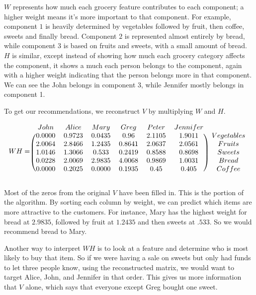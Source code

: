 $W$ represents how much each grocery feature contributes to each component; a higher weight means it's more important to that component.
For example, component $1$ is heavily determined by vegetables followed by fruit, then coffee, sweets and finally bread.
Component $2$ is represented almost entirely by bread, while component $3$ is based on fruits and sweets, with a small amount of bread.
$H$ is similar, except instead of showing how much each grocery category affects the component, it shows a much each person belongs to the component, again with a higher weight indicating that the person belongs more in that component.
We can see the John belongs in component $3$, while Jennifer mostly belongs in component 1.

To get our recommendations, we reconstruct $V$ by multiplying $W$ and $H$.

\[
WH =
\begin{blockarray}{ccccccc}
  John&  Alice  &Mary & Greg & Peter & Jennifer\\
  \begin{block}{(cccccc)c}
  0.0000&  0.9723 & 0.0435 & 0.96 & 2.1105 &   1.9011 &Vegetables\\
      2.0064 & 2.8466 & 1.2435 & 0.8641&  2.0637  &  2.0561 &Fruits\\
      1.0146 & 1.3066 &  0.533&  0.2419&  0.8588  &  0.8698 &Sweets\\
       0.0228 & 2.0069 & 2.9835 & 4.0068 & 0.9869 &   1.0031 &Bread\\
     0.0000 & 0.2025 & 0.0000&  0.1935 & 0.45  &  0.405 &Coffee\\
   \end{block}
   \end{blockarray}
\]

Most of the zeros from the original $V$ have been filled in.
This is the  portion of the algorithm.
By sorting each column by weight, we can predict which items are more attractive to the customers.
For instance, Mary has the highest weight for bread at $2.9835$, followed by fruit at $1.2435$ and then sweets at $.533$.
So we would recommend bread to Mary.

Another way to interpret $WH$ is to look at a feature and determine who is most likely to buy that item.
So if we were having a sale on sweets but only had funds to let three people know, using the reconstructed matrix, we would want to target Alice, John, and Jennifer in that order.
This gives us more information that $V$ alone, which says that everyone except Greg bought one sweet.


